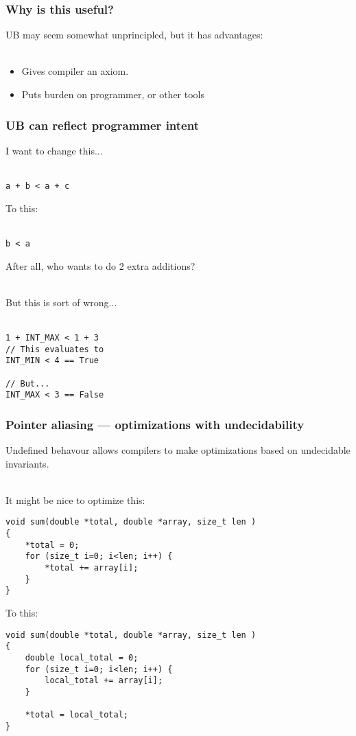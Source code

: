 \documentclass[handout]{beamer}
\begin{document}
\begin{frame}
  \frametitle{Why is this useful?}

  UB may seem somewhat unprincipled, but it has advantages:\\~

  \begin{itemize}
  \item Gives compiler an axiom.
  \item Puts burden on programmer, or other tools
  \end{itemize}

\end{frame}

\begin{frame}
  \frametitle{UB can reflect programmer intent}

  I want to change this...\\~

\begin{lstlisting}
a + b < a + c
\end{lstlisting}

  \pause

  To this:\\~

\begin{lstlisting}
b < a
\end{lstlisting}

  After all, who wants to do 2 extra additions?\\~

  \pause

  But this is sort of wrong...\\~

\begin{lstlisting}
1 + INT_MAX < 1 + 3
// This evaluates to
INT_MIN < 4 == True

// But...
INT_MAX < 3 == False
\end{lstlisting}
\end{frame}

\begin{frame}[fragile]
  \frametitle{Pointer aliasing --- optimizations with undecidability}

  Undefined behavour allows compilers to make optimizations based on
  undecidable invariants.\\~

  \pause

  It might be nice to optimize this:

\begin{lstlisting}
void sum(double *total, double *array, size_t len )
{
    *total = 0;
    for (size_t i=0; i<len; i++) {
        *total += array[i];
    }
}
\end{lstlisting}

  To this:

\begin{lstlisting}
void sum(double *total, double *array, size_t len )
{
    double local_total = 0;
    for (size_t i=0; i<len; i++) {
        local_total += array[i];
    }

    *total = local_total;
}
\end{lstlisting}

\end{frame}
\end{document}
